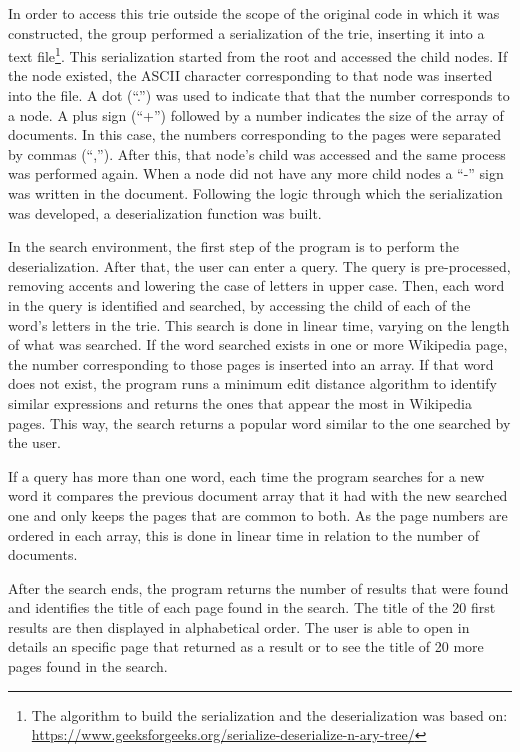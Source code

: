 \documentclass{article}
\begin{document}

In order to access this trie outside the scope of the original code in which it was constructed, the group performed a serialization of the trie, inserting it into a text file\footnote{The algorithm to build the serialization and the deserialization was based on: \url{https://www.geeksforgeeks.org/serialize-deserialize-n-ary-tree/}}. This serialization started from the root and accessed the child nodes. If the node existed, the ASCII character corresponding to that node was inserted into the file. A dot (``.'') was used to indicate that that the number corresponds to a node. A plus sign (``+'') followed by a number indicates the size of the array of documents. In this case, the numbers corresponding to the pages were separated by commas (``,''). After this, that node's child was accessed and the same process was performed again. When a node did not have any more child nodes a ``-'' sign was written in the document. Following the logic through which the serialization was developed, a deserialization function was built. 

In the search environment, the first step of the program is to perform the deserialization. After that, the user can enter a query.  The query is pre-processed, removing accents and lowering the case of letters in upper case. Then, each word in the query is identified and searched, by accessing the child of each of the word's letters in the trie. This search is done in linear time, varying on the length of what was searched. If the word searched exists in one or more Wikipedia page, the number corresponding to those pages is inserted into an array. If that word does not exist, the program runs a minimum edit distance algorithm to identify similar expressions and returns the ones that appear the most in Wikipedia pages. This way, the search returns a popular word similar to the one searched by the user. 

If a query has more than one word, each time the program searches for a new word it compares the previous document array that it had with the new searched one and only keeps the pages that are common to both. As the page numbers are ordered in each array, this is done in linear time in relation to the number of documents. 

After the search ends, the program returns the number of results that were found and identifies the title of each page found in the search. The title of the 20 first results are then displayed in alphabetical order. The user is able to open in details an specific page that returned as a result or to see the title of 20 more pages found in the search. 
\end{document}
